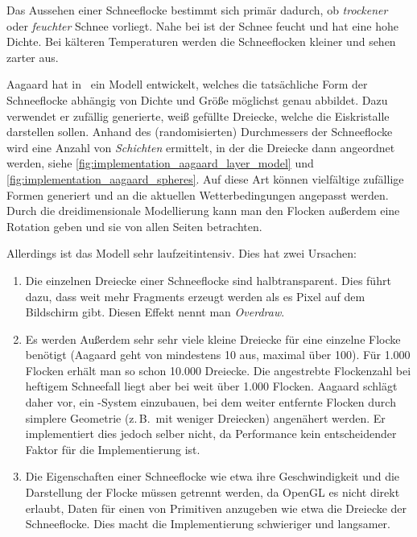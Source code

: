 Das Aussehen einer Schneeflocke bestimmt sich primär dadurch, ob
\emph{trockener} oder \emph{feuchter} Schnee vorliegt. Nahe bei
 ist der Schnee feucht und hat eine hohe
Dichte. Bei kälteren Temperaturen werden die Schneeflocken kleiner und
sehen zarter aus.

Aagaard hat in~\cite{Aagaard2004} ein Modell entwickelt, welches die
tatsächliche Form der Schneeflocke abhängig von Dichte und Größe
möglichst genau abbildet. Dazu verwendet er zufällig generierte, weiß
gefüllte Dreiecke, welche die Eiskristalle darstellen sollen. Anhand
des (randomisierten) Durchmessers der Schneeflocke wird eine Anzahl
von \emph{Schichten} ermittelt, in der die Dreiecke dann angeordnet werden,
siehe \cref{fig:implementation_aagaard_layer_model} und
\cref{fig:implementation_aagaard_spheres}. Auf diese Art können
vielfältige zufällige Formen generiert und an die aktuellen
Wetterbedingungen angepasst werden. Durch die dreidimensionale
Modellierung kann man den Flocken außerdem eine Rotation geben und sie
von allen Seiten betrachten.

Allerdings ist das Modell sehr laufzeitintensiv. Dies hat zwei Ursachen:

\begin{enumerate}
\item Die einzelnen Dreiecke einer Schneeflocke sind
halbtransparent. Dies führt dazu, dass weit mehr Fragments erzeugt
werden als es Pixel auf dem Bildschirm gibt. Diesen Effekt nennt man
\emph{Overdraw}.
\item Es werden Außerdem sehr sehr viele kleine Dreiecke für eine einzelne
Flocke benötigt (Aagaard geht von mindestens 10 aus, maximal über
100). Für 1.000 Flocken erhält man so schon 10.000 Dreiecke. Die
angestrebte Flockenzahl bei heftigem Schneefall liegt aber bei weit
über 1.000 Flocken. Aagaard schlägt daher vor, ein -System einzubauen, bei dem weiter entfernte Flocken durch
simplere Geometrie (z.\,B.\ mit weniger Dreiecken) angenähert werden. Er
implementiert dies jedoch selber nicht, da Performance kein
entscheidender Faktor für die Implementierung ist.
\item Die Eigenschaften einer Schneeflocke wie etwa ihre Geschwindigkeit
und die Darstellung der Flocke müssen getrennt werden, da OpenGL es
nicht direkt erlaubt, Daten für einen  von
Primitiven anzugeben wie etwa die Dreiecke der Schneeflocke. Dies
macht die Implementierung schwieriger und langsamer.
\end{enumerate}

